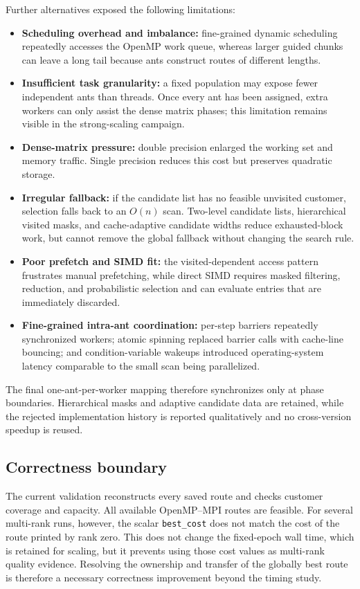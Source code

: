 Further alternatives exposed the following limitations:
\begin{itemize}[leftmargin=*,nosep]
    \item \textbf{Scheduling overhead and imbalance:} fine-grained dynamic scheduling repeatedly accesses the OpenMP work queue, whereas larger guided chunks can leave a long tail because ants construct routes of different lengths.
    \item \textbf{Insufficient task granularity:} a fixed population may expose fewer independent ants than threads.  Once every ant has been assigned, extra workers can only assist the dense matrix phases; this limitation remains visible in the strong-scaling campaign.
    \item \textbf{Dense-matrix pressure:} double precision enlarged the working set and memory traffic.  Single precision reduces this cost but preserves quadratic storage.
    \item \textbf{Irregular fallback:} if the candidate list has no feasible unvisited customer, selection falls back to an $O(n)$ scan.  Two-level candidate lists, hierarchical visited masks, and cache-adaptive candidate widths reduce exhausted-block work, but cannot remove the global fallback without changing the search rule.
    \item \textbf{Poor prefetch and SIMD fit:} the visited-dependent access pattern frustrates manual prefetching, while direct SIMD requires masked filtering, reduction, and probabilistic selection and can evaluate entries that are immediately discarded.
    \item \textbf{Fine-grained intra-ant coordination:} per-step barriers repeatedly synchronized workers; atomic spinning replaced barrier calls with cache-line bouncing; and condition-variable wakeups introduced operating-system latency comparable to the small scan being parallelized.
\end{itemize}

The final one-ant-per-worker mapping therefore synchronizes only at phase boundaries.  Hierarchical masks and adaptive candidate data are retained, while the rejected implementation history is reported qualitatively and no cross-version speedup is reused.

\subsection{Correctness boundary}

The current validation reconstructs every saved route and checks customer coverage and capacity.  All available OpenMP--MPI routes are feasible.  For several multi-rank runs, however, the scalar \texttt{best\_cost} does not match the cost of the route printed by rank zero.  This does not change the fixed-epoch wall time, which is retained for scaling, but it prevents using those cost values as multi-rank quality evidence.  Resolving the ownership and transfer of the globally best route is therefore a necessary correctness improvement beyond the timing study.
